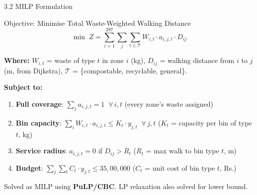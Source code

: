 \documentclass[aspectratio=169]{beamer}
\begin{document}
\begin{frame}{3.2 MILP Formulation}
    \begin{alertblock}{Objective: Minimise Total Waste-Weighted Walking Distance}
        $$ \min \; Z = \sum_{i=1}^{287} \sum_{j} \sum_{t \in \mathcal{T}} W_{i,t} \cdot a_{i,j,t} \cdot D_{ij} $$
    \end{alertblock}

    \footnotesize
    \textbf{Where:} $W_{i,t}$ = waste of type $t$ in zone $i$ (kg), \; $D_{ij}$ = walking distance from $i$ to $j$ (m, from Dijkstra), \; $\mathcal{T}$ = \{compostable, recyclable, general\}.

    \vspace{0.15cm}
    \textbf{Subject to:}
    \begin{enumerate}
        \item \textbf{Full coverage}: $\sum_{j} a_{i,j,t} = 1 \;\; \forall\, i, t$ \hfill (every zone's waste assigned)
        \item \textbf{Bin capacity}: $\sum_{i} W_{i,t} \cdot a_{i,j,t} \le K_t \cdot y_{j,t} \;\; \forall\, j, t$ \hfill ($K_t$ = capacity per bin of type $t$, kg)
        \item \textbf{Service radius}: $a_{i,j,t} = 0$ if $D_{ij} > R_t$ \hfill ($R_t$ = max walk to bin type $t$, m)
        \item \textbf{Budget}: $\sum_{j} \sum_{t} C_t \cdot y_{j,t} \le 35{,}00{,}000$ \hfill ($C_t$ = unit cost of bin type $t$, Rs.)
    \end{enumerate}

    \vspace{0.1cm}
    \normalsize
    Solved as MILP using \textbf{PuLP/CBC}. LP relaxation also solved for lower bound.
\end{frame}
\end{document}
